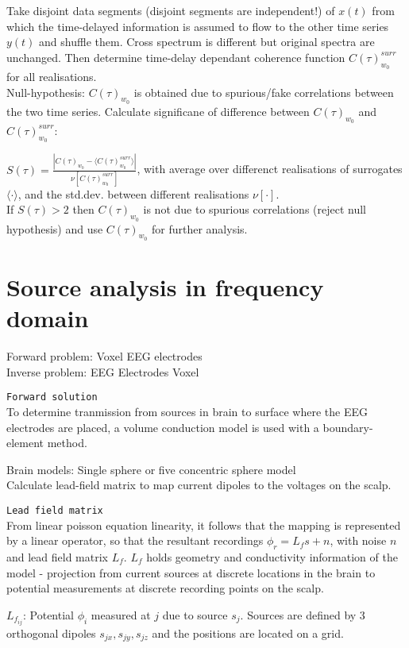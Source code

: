 Take disjoint data segments (disjoint segments are independent!) of $x(t)$ from which the time-delayed information is assumed to flow to the other time series $y(t)$ and shuffle them. Cross spectrum is different but original spectra are unchanged. Then determine time-delay dependant coherence function $C(\tau)_{w_0}^{surr}$ for all realisations.\\
Null-hypothesis: $C(\tau)_{w_0}$ is obtained due to spurious/fake correlations between the two time series. Calculate significane of difference between $C(\tau)_{w_0}$ and $C(\tau)_{w_0}^{surr}$:\vs

$S(\tau) = \frac{|C(\tau)_{w_0} - \langle C(\tau)_{w_0}^{surr} \rangle |}{\nu [C(\tau)_{w_0}^{surr} ]}$, with average over differenct realisations of surrogates $\langle \cdot \rangle$, and the std.dev. between different realisations $\nu[\cdot]$.\\
If $S(\tau)>2$ then $C(\tau)_{w_0}$ is not due to spurious correlations (reject null hypothesis) and use $C(\tau)_{w_0}$ for further analysis.

\section{Source analysis in frequency domain}
Forward problem: Voxel \arr EEG electrodes\\
Inverse problem: EEG Electrodes \arr Voxel\\
\drwspc

\verb!Forward solution!\\
To determine tranmission from sources in brain to surface where the EEG electrodes are placed, a volume conduction model is used with a boundary-element method.\vs

Brain models: Single sphere or five concentric sphere model\\
Calculate lead-field matrix to map current dipoles to the voltages on the scalp.

\verb!Lead field matrix!\\
From linear poisson equation linearity, it follows that the mapping is represented by a linear operator, so that the resultant recordings $\phi_r = L_fs+n$, with noise $n$ and lead field matrix $L_f$. $L_f$ holds geometry and conductivity information of the model - projection from current sources at discrete locations in the brain to potential measurements at discrete recording points on the scalp.\vs

$L_{f_{ij}}$: Potential $\phi_i$ measured at $j$ due to source $s_j$. Sources are defined by 3 orthogonal dipoles $s_{jx}, s_{jy}, s_{jz}$ and the positions are located on a grid.\vs

